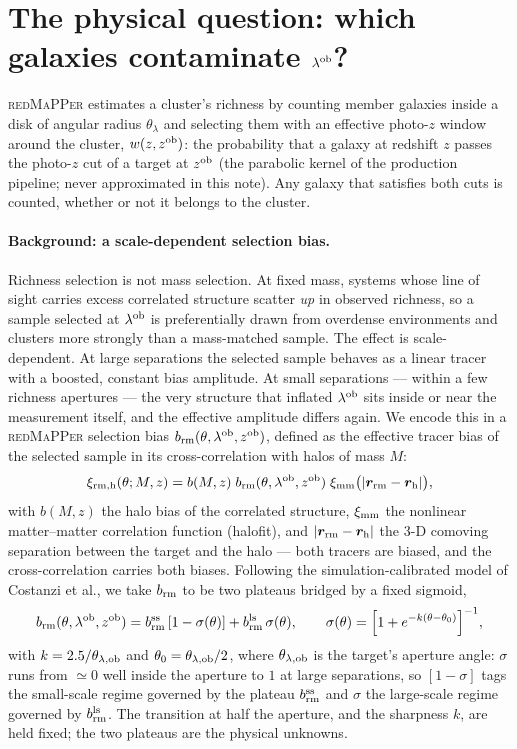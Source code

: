 \documentclass[a4paper, 11pt]{article}
\newcommand{\lob}{\lambda^{\rm ob}}
\newcommand{\zob}{z^{\rm ob}}
\newcommand{\ximm}{\xi_{\rm mm}}
\newcommand{\thob}{\theta_{\lambda,{\rm ob}}}
\newcommand{\brm}{b_{\rm rm}}
\newcommand{\brmss}{b_{\rm rm}^{\rm ss}}
\newcommand{\brmls}{b_{\rm rm}^{\rm ls}}
\begin{document}
\tableofcontents

\section{The physical question: which galaxies contaminate \texorpdfstring{$\lob$}{lambda-ob}?}
\label{sec:question}

\textsc{redMaPPer} estimates a cluster's richness by counting
member galaxies inside a disk of angular radius $\theta_\lambda$
and selecting them with an effective photo-$z$ window around the
cluster, $w(z,\zob)$: the probability that a galaxy at redshift
$z$ passes the photo-$z$ cut of a target at $\zob$ (the parabolic
kernel of the production pipeline; never approximated in this
note). Any galaxy that satisfies both cuts is counted, whether or
not it belongs to the cluster.

\paragraph{Background: a scale-dependent selection bias.}
Richness selection is not mass selection. At fixed mass, systems
whose line of sight carries excess correlated structure scatter
\emph{up} in observed richness, so a sample selected at $\lob$ is
preferentially drawn from overdense environments and clusters
more strongly than a mass-matched sample. The effect is
scale-dependent. At large separations the selected sample behaves
as a linear tracer with a boosted, constant bias amplitude. At
small separations --- within a few richness apertures --- the very
structure that inflated $\lob$ sits inside or near the
measurement itself, and the effective amplitude differs again.
We encode this in a \textsc{redMaPPer} selection bias
$\brm(\theta,\lob,\zob)$, defined as the effective tracer bias of
the selected sample in its cross-correlation with halos of mass
$M$:
\begin{equation}
\xi_{\rm rm,h}(\theta; M, z)
= b(M, z)\; \brm(\theta, \lob, \zob)\;
\ximm\big(|\bm{r}_{\rm rm} - \bm{r}_{\rm h}|\big),
\label{eq:xi_rmh}
\end{equation}
with $b(M,z)$ the halo bias of the correlated structure, $\ximm$
the nonlinear matter--matter correlation function (halofit), and
$|\bm{r}_{\rm rm}-\bm{r}_{\rm h}|$ the 3-D comoving separation
between the target and the halo --- both tracers are biased, and
the cross-correlation carries both biases. Following the
simulation-calibrated model of Costanzi et al., we take
$\brm$ to be two plateaus bridged by a fixed sigmoid,
\begin{equation}
\brm(\theta, \lob, \zob)
= \brmss\,[1-\sigma(\theta)] + \brmls\,\sigma(\theta),
\qquad
\sigma(\theta)=\Big[1+e^{-k(\theta-\theta_0)}\Big]^{-1},
\label{eq:brm}
\end{equation}
with $k=2.5/\thob$ and $\theta_0=\thob/2$, where
$\thob$ is the target's aperture angle: $\sigma$ runs from
$\simeq0$ well inside the aperture to $1$ at large separations,
so $[1-\sigma]$ tags the small-scale regime governed by the
plateau $\brmss$ and $\sigma$ the large-scale regime governed by
$\brmls$. The transition at half the aperture, and the sharpness
$k$, are held fixed; the two plateaus are the physical unknowns.
\end{document}
